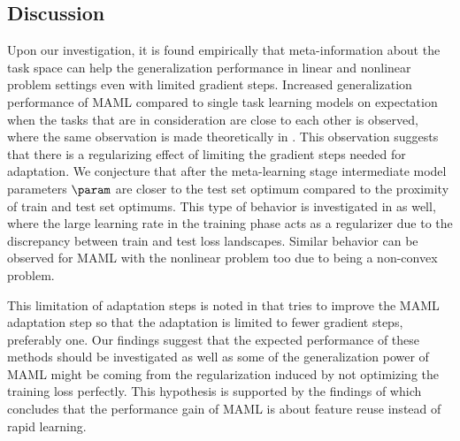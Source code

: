 \subsection{Discussion}

Upon our investigation, it is found empirically that meta-information about the task space can help the generalization performance in linear and nonlinear problem settings even with limited gradient steps. Increased generalization performance of MAML compared to single task learning models on expectation when the tasks that are in consideration are close to each other is observed, where the same observation is made theoretically in \cite{fallah2021}. This observation suggests that there is a regularizing effect of limiting the gradient steps needed for adaptation. We conjecture that after the meta-learning stage intermediate model parameters $\param$ are closer to the test set optimum compared to the proximity of train and test set optimums. This type of behavior is investigated in \cite{nakkiran2020} as well, where the large learning rate in the training phase acts as a regularizer due to the discrepancy between train and test loss landscapes. Similar behavior can be observed for MAML with the nonlinear problem too due to being a non-convex problem. 

This limitation of adaptation steps is noted in \cite{behl2019,li2017b} that tries to improve the MAML adaptation step so that the adaptation is limited to fewer gradient steps, preferably one. Our findings suggest that the expected performance of these methods should be investigated as well as some of the generalization power of MAML might be coming from the regularization induced by not optimizing the training loss perfectly. This hypothesis is supported by the findings of \cite{raghu2020} which concludes that the performance gain of MAML is about feature reuse instead of rapid learning.


